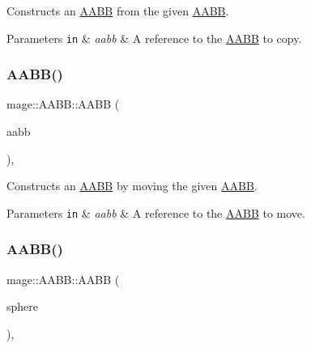Constructs an \hyperlink{classmage_1_1_a_a_b_b}{A\+A\+BB} from the given \hyperlink{classmage_1_1_a_a_b_b}{A\+A\+BB}.


\begin{DoxyParams}[1]{Parameters}
\mbox{\tt in}  & {\em aabb} & A reference to the \hyperlink{classmage_1_1_a_a_b_b}{A\+A\+BB} to copy. \\
\hline
\end{DoxyParams}
\hypertarget{classmage_1_1_a_a_b_b_ad679d44369d5300de286e1fef947df1f}{}\label{classmage_1_1_a_a_b_b_ad679d44369d5300de286e1fef947df1f} 
\subsubsection{\texorpdfstring{A\+A\+B\+B()}{AABB()}\hspace{0.1cm}{\footnotesize\ttfamily [7/8]}}
{\footnotesize\ttfamily mage\+::\+A\+A\+B\+B\+::\+A\+A\+BB (\begin{DoxyParamCaption}\item[{\hyperlink{classmage_1_1_a_a_b_b}{A\+A\+BB} \&\&}]{aabb }\end{DoxyParamCaption})\hspace{0.3cm}{\ttfamily [default]}, {\ttfamily [noexcept]}}

Constructs an \hyperlink{classmage_1_1_a_a_b_b}{A\+A\+BB} by moving the given \hyperlink{classmage_1_1_a_a_b_b}{A\+A\+BB}.


\begin{DoxyParams}[1]{Parameters}
\mbox{\tt in}  & {\em aabb} & A reference to the \hyperlink{classmage_1_1_a_a_b_b}{A\+A\+BB} to move. \\
\hline
\end{DoxyParams}
\hypertarget{classmage_1_1_a_a_b_b_a16194c87d55c8461402682c3ff5db730}{}\label{classmage_1_1_a_a_b_b_a16194c87d55c8461402682c3ff5db730} 
\subsubsection{\texorpdfstring{A\+A\+B\+B()}{AABB()}\hspace{0.1cm}{\footnotesize\ttfamily [8/8]}}
{\footnotesize\ttfamily mage\+::\+A\+A\+B\+B\+::\+A\+A\+BB (\begin{DoxyParamCaption}\item[{const \hyperlink{classmage_1_1_bounding_sphere}{Bounding\+Sphere} \&}]{sphere }\end{DoxyParamCaption})\hspace{0.3cm}{\ttfamily [explicit]}, {\ttfamily [noexcept]}}

